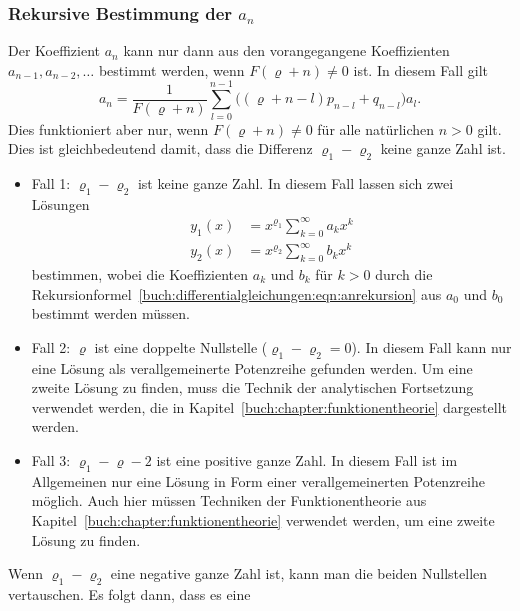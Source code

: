 %
%
\subsubsection{Rekursive Bestimmung der $a_n$}
Der Koeffizient $a_{n}$ kann nur dann aus den vorangegangene
Koeffizienten $a_{n-1},a_{n-2},\dots$ bestimmt werden, wenn
$F(\varrho+n)\ne 0$ ist.
In diesem Fall gilt
\begin{equation}
a_n
=
\frac{1}{F(\varrho+n)}
\sum_{l=0}^{n-1}\bigl( (\varrho+n-l)p_{n-l} + q_{n-l}\bigr)a_l.
\label{buch:differentialgleichungen:eqn:anrekursion}
\end{equation}
Dies funktioniert aber nur, wenn $F(\varrho+n)\ne 0$ für alle
natürlichen $n > 0$ gilt.
Dies ist gleichbedeutend damit, dass die Differenz $\varrho_1-\varrho_2$
keine ganze Zahl ist.

\begin{itemize}
\item
Fall 1: $\varrho_1-\varrho_2$ ist keine ganze Zahl.
In diesem Fall lassen sich zwei Lösungen
\begin{align*}
y_1(x) &= x^{\varrho_1}\sum_{k=0}^\infty a_k x^k
\\
y_2(x) &= x^{\varrho_2}\sum_{k=0}^\infty b_k x^k
\end{align*}
bestimmen, wobei die Koeffizienten $a_k$ und $b_k$ für $k>0$ durch
die Rekursionformel~\eqref{buch:differentialgleichungen:eqn:anrekursion}
aus $a_0$ und $b_0$ bestimmt werden müssen.

\item
Fall 2: $\varrho$ ist eine doppelte Nullstelle ($\varrho_1-\varrho_2=0$).
In diesem Fall kann nur eine Lösung als verallgemeinerte Potenzreihe
gefunden werden.
Um eine zweite Lösung zu finden, muss die Technik der analytischen
Fortsetzung verwendet werden, die in
Kapitel~\ref{buch:chapter:funktionentheorie}
dargestellt werden.

\item
Fall 3: $\varrho_1-\varrho-2$ ist eine positive ganze Zahl.
In diesem Fall ist im Allgemeinen nur eine Lösung in Form einer
verallgemeinerten Potenzreihe möglich.
Auch hier müssen Techniken der Funktionentheorie aus
Kapitel~\ref{buch:chapter:funktionentheorie}
verwendet werden, um eine zweite Lösung zu finden.

\end{itemize}

Wenn $\varrho_1-\varrho_2$ eine negative ganze Zahl ist, kann man die
beiden Nullstellen vertauschen.
Es folgt dann, dass es eine  





